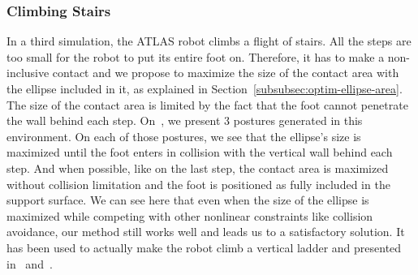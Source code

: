 %



\subsubsection{Climbing Stairs}
\label{subsubsec:smallStairs}


In a third simulation, the ATLAS robot climbs a flight of stairs.
All the steps are too small for the robot to put its entire foot on.
Therefore, it has to make a non-inclusive contact and we propose to maximize the size of the contact area with the ellipse included in it, as explained in Section~\ref{subsubsec:optim-ellipse-area}.
The size of the contact area is limited by the fact that the foot cannot penetrate the wall behind each step.
On~, we present 3 postures generated in this environment.
On each of those postures, we see that the ellipse's size is maximized until the foot enters in collision with the vertical wall behind each step.
And when possible, like on the last step, the contact area is maximized without collision limitation and the foot is positioned as fully included in the support surface.
We can see here that even when the size of the ellipse is maximized while competing with other nonlinear constraints like collision avoidance, our method still works well and leads us to a satisfactory solution.
It has been used to actually make the robot climb a vertical ladder and presented in~\cite{vaillant:autonomousrobots:2016} and~\cite{vaillant:humanoids:2014}.


